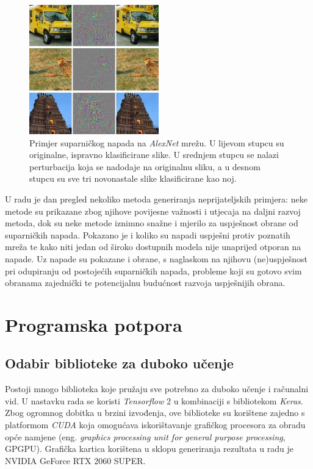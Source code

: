 \documentclass[utf8, diplomski]{fer}
\begin{document}
\begin{figure}[H]
\centering
\includegraphics[width=0.5\textwidth,keepaspectratio]{img/other/alexnet_adv.jpg}
\caption{Primjer suparničkog napada na \textit{AlexNet} mrežu\citep{Szegedy2014IntriguingPO}. U lijevom stupcu su originalne, ispravno klasificirane slike. U srednjem stupcu se nalazi perturbacija koja se nadodaje na originalnu sliku, a u desnom stupcu su sve tri novonastale slike klasificirane kao noj.}
\label{fig:alexnet_adv}
\end{figure}

U radu je dan pregled nekoliko metoda generiranja neprijateljskih primjera: neke metode su prikazane zbog njihove povijesne važnosti i utjecaja na daljni razvoj metoda, dok su neke metode iznimno snažne i mjerilo za uspješnost obrane od suparničkih napada. Pokazano je i koliko su napadi uspješni protiv poznatih mreža te kako niti jedan od široko dostupnih modela nije unaprijed otporan na napade. Uz napade su pokazane i obrane, s naglaskom na njihovu (ne)uspješnost pri odupiranju od postojećih suparničkih napada, probleme koji su gotovo svim obranama zajednički te potencijalnu budućnost razvoja uspješnijih obrana. 


\chapter{Programska potpora}
\section{Odabir biblioteke za duboko učenje}
Postoji mnogo biblioteka koje pružaju sve potrebno za duboko učenje i računalni vid. U nastavku rada se koristi \textit{Tensorflow} 2\citep{abadi2016tensorflow} u kombinaciji s bibliotekom \textit{Keras}\citep{chollet2015keras}. Zbog ogromnog dobitka u brzini izvođenja, ove biblioteke su korištene zajedno s platformom \textit{CUDA} koja omogućava iskorištavanje grafičkog procesora za obradu opće namjene (eng. \textit{graphics processing unit for general purpose processing}, GPGPU). Grafička kartica korištena u sklopu generiranja rezultata u radu je NVIDIA GeForce RTX 2060 SUPER.
\end{document}
